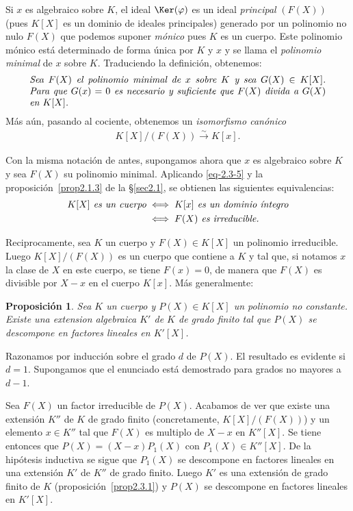\documentclass[bibtotoc,leqno,spanish]{amsbook}
\renewcommand{\to}[1][]{\xrightarrow{#1}}
\numberwithin{equation}{section}
\theoremstyle{note}
\theoremstyle{note}
\newtheorem{proposition}{Proposici\'on}
\theoremstyle{rem}
\numberwithin{theorem}{section}
\numberwithin{proposition}{section}
\numberwithin{definition}{section}
\numberwithin{lemma}{section}
\numberwithin{corollary}{section}
\numberwithin{example}{section}
\numberwithin{footnote}{section}%
\begin{document}
Si $x$ es algebraico sobre $K$, el ideal $\Ker(\varphi)$ es un ideal {\em principal} $(F(X))$
(pues $K[X]$ es un dominio de ideales principales) generado por un polinomio no nulo $F(X)$ que podemos
suponer {\em m\'onico} pues $K$ es un cuerpo. Este polinomio m\'onico est\'a determinado de forma \'unica por
$K$ y $x$ y se llama el {\em polinomio minimal} de $x$ sobre $K$. Traduciendo la definici\'on, obtenemos:
\begin{gather}\label{eq-2.3-5}
\text{\parbox{0.9\textwidth}{\itshape Sea $F(X)$ el polinomio minimal de $x$ sobre $K$ y sea $G(X)\in K[X]$. Para que
$G(x) = 0$ es necesario y suficiente que $F(X)$ divida a $G(X)$ en $K[X]$.}}
\end{gather}
M\'as a\'un, pasando al cociente, obtenemos un {\em isomorfismo can\'onico}
\begin{gather}\label{eq-2.3-6}
K[X]/(F(X))\to[\sim] K[x].
\end{gather}

Con la misma notaci\'on de antes, supongamos ahora que $x$ es algebraico sobre $K$ y sea $F(X)$ su polinomio
minimal. Aplicando \eqref{eq-2.3-5} y la proposici\'on~\ref{prop2.1.3} de la \S\ref{sec2.1}, se obtienen las siguientes equivalencias:
\begin{align}
\text{\itshape $K[X]$ es un cuerpo} &\iff \text{\itshape $K[x]$ es un dominio \'integro}\\
&\iff \text{\itshape $F(X)$ es irreducible.}\notag
\end{align}

Reciprocamente, sea $K$ un cuerpo y $F(X)\in K[X]$ un polinomio irreducible. Luego $K[X]/(F(X))$ es un cuerpo
que contiene a $K$ y tal que, si notamos $x$ la clase de $X$ en este cuerpo, se tiene $F(x) = 0$, de manera que
$F(X)$ es divisible por $X-x$ en el cuerpo $K[x]$. M\'as generalmente:

\begin{proposition}\label{prop2.3.3}
Sea $K$ un cuerpo y $P(X)\in K[X]$ un polinomio no constante. Existe una extension algebraica $K'$ de $K$ de
grado finito tal que $P(X)$ se descompone en factores lineales en $K'[X]$.
\end{proposition}

Razonamos por inducci\'on sobre el grado $d$ de $P(X)$. El resultado es evidente si $d=1$. Supongamos que el enunciado est\'a
demostrado para grados no mayores a $d-1$.

Sea $F(X)$ un factor irreducible de $P(X)$. Acabamos de ver que existe
una extensi\'on $K''$ de $K$ de grado finito (concretamente, $K[X]/(F(X))$) y un elemento $x\in K''$ tal que
$F(X)$ es multiplo de $X-x$ en $K''[X]$. Se tiene entonces que $P(X) = (X-x)P_{1}(X)$ con $P_{1}(X)\in K''[X]$.
De la hip\'otesis inductiva se sigue que $P_{1}(X)$ se descompone en factores lineales en una extensi\'on
$K'$ de $K''$ de grado finito. Luego $K'$ es una extensi\'on de grado finito de $K$
(proposici\'on~\ref{prop2.3.1}) y
$P(X)$ se descompone en factores lineales en $K'[X]$.
\end{document}
